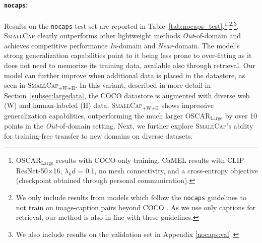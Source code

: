 \documentclass[10pt,twocolumn,letterpaper]{article}
\newcommand{\model}{\textsc{SmallCap}\xspace}
\begin{document}

\paragraph{\texttt{nocaps}:}
Results on the \texttt{nocaps} test set are reported in Table~\ref{tab:nocaps_test}.\footnote{OSCAR$_{\text{Large}}$ results with COCO-only training. CaMEL results with CLIP-ResNet-50×16, $\lambda_kd$ = 0.1, no mesh connectivity, and a cross-entropy objective (checkpoint obtained through personal communication).}$^{,}$\footnote{We only include results from models which follow the \texttt{nocaps} guidelines to not train on image-caption pairs beyond COCO \cite{Agrawal_2019}. As we use only captions for retrieval, our method is also in line with these guidelines. }$^{,}$\footnote{We also include results on the validation set in Appendix \ref{nocaps:val}.}. %
\model clearly outperforms other lightweight methods \textit{Out}-of-domain and achieves competitive performance \textit{In}-domain and \textit{Near}-domain. The model's strong generalization capabilities point to it being less prone to over-fitting as it does not need to memorize its training data, available also through retrieval. 
Our model can further improve when additional data is placed in the datastore, as seen in \textsc{SmallCap}$_{\text{+W+H}}$. In this variant, described in more detail in Section~\ref{subsec:largedata}, the COCO datastore is augmented with diverse web (W) and human-labeled (H) data. \textsc{SmallCap}$_{\text{+W+H}}$ shows impressive generalization capabilities, outperforming the much larger OSCAR$_{\text{Large}}$ by over 10 points in the \textit{Out}-of-domain setting.  %
Next, we further explore \model's ability for training-free transfer to new domains on diverse datasets.


\end{document}
